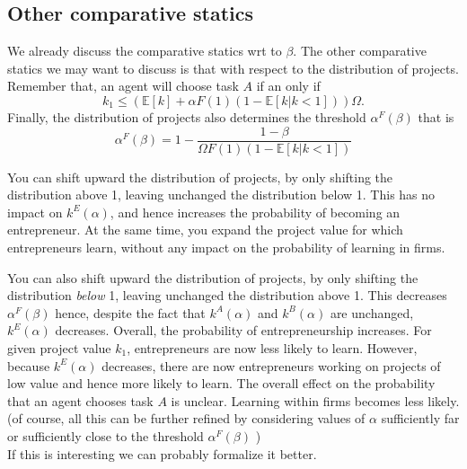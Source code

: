 \documentclass[12pt,american]{paper}
\theoremstyle{remark}
\newcommand{\E}[1]{\mathbb E[#1]}
\begin{document}
\subsection{Other comparative statics}

{\color{red} We already discuss the comparative statics wrt to $\beta$. The other comparative statics we may want to discuss is that with respect to the distribution of projects. Remember that, an agent will choose task $A$ if an only if
\[
k_1 \leq \left(\E{k} +\alpha F(1) (1-\E{k|k<1}) \right) \Omega.
\] 
Finally, the distribution of projects also determines the threshold $\alpha^F(\beta)$ that is
\[
\alpha^F(\beta) = 1-\frac{1-\beta}{\Omega F(1) (1-\E{k|k<1}) }
\]

You can shift upward the distribution of projects, by only shifting the distribution above 1, leaving unchanged the distribution  below 1. This has no impact on $k^E(\alpha)$, and hence increases the probability of becoming an entrepreneur. At the same time,  you expand the project value for which entrepreneurs learn, without any impact on the probability of learning in firms. 

You can also shift upward the distribution of projects, by only shifting the distribution \textit{below} 1, leaving unchanged the distribution  above 1. This decreases $\alpha^F(\beta)$ hence, despite the fact that $k^A(\alpha)$ and $k^B(\alpha)$ are unchanged, $k^E(\alpha)$ decreases. Overall, the probability of entrepreneurship increases. For given project value $k_1$, entrepreneurs are now less likely to learn. However, because $k^E(\alpha)$ decreases, there are now entrepreneurs working on projects of low value and hence more likely to learn. The overall effect on the probability that an agent chooses task $A$ is unclear. Learning within firms becomes less likely. (of course, all this can be further refined by considering values of $\alpha$ sufficiently far or sufficiently close to the threshold $\alpha^F(\beta)$ )
\\
If this is interesting we can probably formalize it better.


}


\end{document}
